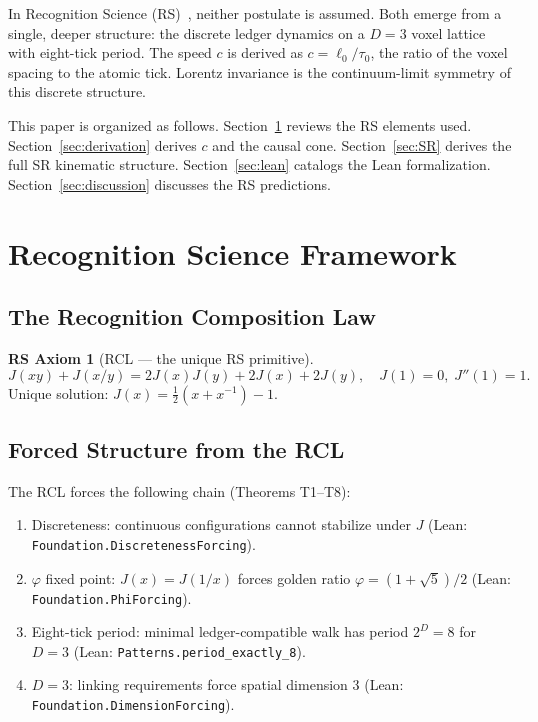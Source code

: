 \documentclass[12pt,a4paper]{article}
\theoremstyle{definition}
\newtheorem{axiom_rs}[theorem]{RS Axiom}
\theoremstyle{remark}
\begin{document}
In Recognition Science (RS)~\cite{Washburn2026a}, neither postulate is
assumed.  Both emerge from a single, deeper structure: the discrete
ledger dynamics on a $D=3$ voxel lattice with eight-tick period.  The
speed $c$ is derived as $c = \ell_0/\tau_0$, the ratio of the voxel
spacing to the atomic tick.  Lorentz invariance is the continuum-limit
symmetry of this discrete structure.

This paper is organized as follows.  Section~\ref{sec:rs} reviews the
RS elements used.  Section~\ref{sec:derivation} derives $c$ and the
causal cone.  Section~\ref{sec:SR} derives the full SR kinematic
structure.  Section~\ref{sec:lean} catalogs the Lean formalization.
Section~\ref{sec:discussion} discusses the RS predictions.

\section{Recognition Science Framework}
\label{sec:rs}

\subsection{The Recognition Composition Law}

\begin{axiom_rs}[RCL --- the unique RS primitive]
\begin{equation}
  J(xy) + J(x/y) = 2J(x)J(y) + 2J(x) + 2J(y),
  \quad J(1)=0,\; J''(1)=1.
  \label{eq:rcl}
\end{equation}
Unique solution: $J(x) = \tfrac{1}{2}(x + x^{-1}) - 1$.
\end{axiom_rs}

\subsection{Forced Structure from the RCL}

The RCL forces the following chain (Theorems T1--T8):
\begin{enumerate}
  \item[(T2)] Discreteness: continuous configurations cannot stabilize
        under $J$ (Lean: \texttt{Foundation.DiscretenessForcing}).
  \item[(T6)] $\varphi$ fixed point: $J(x)=J(1/x)$ forces golden ratio
        $\varphi = (1+\sqrt{5})/2$ (Lean: \texttt{Foundation.PhiForcing}).
  \item[(T7)] Eight-tick period: minimal ledger-compatible walk has period
        $2^D = 8$ for $D=3$ (Lean: \texttt{Patterns.period\_exactly\_8}).
  \item[(T8)] $D=3$: linking requirements force spatial dimension 3
        (Lean: \texttt{Foundation.DimensionForcing}).
\end{enumerate}
\end{document}
